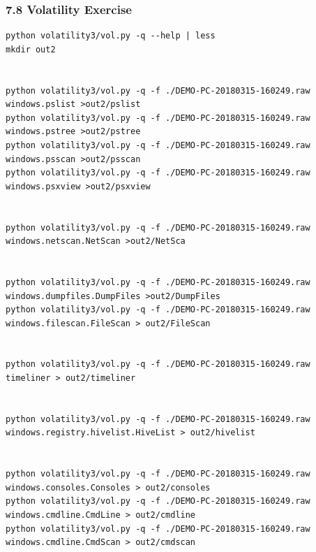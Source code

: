 \begin{frame}[fragile]
  \frametitle{7.8 Volatility Exercise}
    \begin{lstlisting}[basicstyle=\tiny]
python volatility3/vol.py -q --help | less
mkdir out2


python volatility3/vol.py -q -f ./DEMO-PC-20180315-160249.raw windows.pslist >out2/pslist
python volatility3/vol.py -q -f ./DEMO-PC-20180315-160249.raw windows.pstree >out2/pstree
python volatility3/vol.py -q -f ./DEMO-PC-20180315-160249.raw windows.psscan >out2/psscan
python volatility3/vol.py -q -f ./DEMO-PC-20180315-160249.raw windows.psxview >out2/psxview


python volatility3/vol.py -q -f ./DEMO-PC-20180315-160249.raw windows.netscan.NetScan >out2/NetSca


python volatility3/vol.py -q -f ./DEMO-PC-20180315-160249.raw windows.dumpfiles.DumpFiles >out2/DumpFiles
python volatility3/vol.py -q -f ./DEMO-PC-20180315-160249.raw windows.filescan.FileScan > out2/FileScan


python volatility3/vol.py -q -f ./DEMO-PC-20180315-160249.raw timeliner > out2/timeliner


python volatility3/vol.py -q -f ./DEMO-PC-20180315-160249.raw windows.registry.hivelist.HiveList > out2/hivelist


python volatility3/vol.py -q -f ./DEMO-PC-20180315-160249.raw windows.consoles.Consoles > out2/consoles
python volatility3/vol.py -q -f ./DEMO-PC-20180315-160249.raw windows.cmdline.CmdLine > out2/cmdline
python volatility3/vol.py -q -f ./DEMO-PC-20180315-160249.raw windows.cmdline.CmdScan > out2/cmdscan
    \end{lstlisting}
\end{frame}







